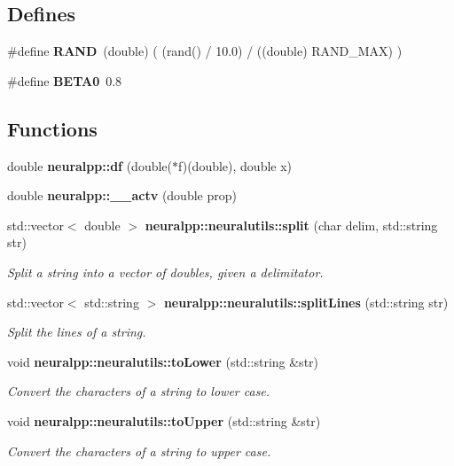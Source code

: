 \subsection*{Defines}
\begin{CompactItemize}
\item 
\#define {\bf RAND}~(double) ( (rand() / 10.0) / ((double) RAND\_\-MAX) )
\item 
\#define {\bf BETA0}~0.8
\end{CompactItemize}
\subsection*{Functions}
\begin{CompactItemize}
\item 
double {\bf neuralpp::df} (double($\ast$f)(double), double x)
\item 
double {\bf neuralpp::\_\-\_\-actv} (double prop)
\item 
std::vector$<$ double $>$ {\bf neuralpp::neuralutils::split} (char delim, std::string str)
\begin{CompactList}\small\item\em Split a string into a vector of doubles, given a delimitator. \item\end{CompactList}\item 
std::vector$<$ std::string $>$ {\bf neuralpp::neuralutils::splitLines} (std::string str)
\begin{CompactList}\small\item\em Split the lines of a string. \item\end{CompactList}\item 
void {\bf neuralpp::neuralutils::toLower} (std::string \&str)
\begin{CompactList}\small\item\em Convert the characters of a string to lower case. \item\end{CompactList}\item 
void {\bf neuralpp::neuralutils::toUpper} (std::string \&str)
\begin{CompactList}\small\item\em Convert the characters of a string to upper case. \item\end{CompactList}\end{CompactItemize}


